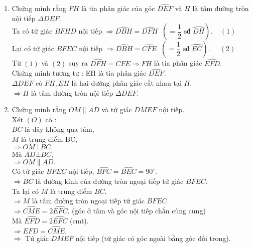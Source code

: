 \begin{ex}
{\begin{enumerate}
					Xét tứ giác $BFEC$ có :
					$\widehat{BFC} = \widehat{BEC}=90 ^{\circ}$\\
					$\Rightarrow$ tứ giác $BFEC$ nội tiếp (tứ giác có $2$ đỉnh liên tiếp cùng nhìn một cạnh dưới hai góc bằng nhau).
			\item Chứng minh rằng $FH$ là tia phân giác của góc $\widehat{DEF}$ và $H$ là tâm đường tròn nội tiếp $\Delta DEF.$\\
					Ta có tứ giác $BFHD$ nội tiếp $\Rightarrow \widehat{DBH} = \widehat{DFH} \;\;(=\dfrac{1}{2}\text{ sđ } \wideparen {DH}).\;\;\;\;(1)$\\
					Lại có tứ giác $BFEC$ nội tiếp $\Rightarrow \widehat{DBH} = \widehat{CFE} \;\;(=\dfrac{1}{2}\text{ sđ } \wideparen {EC}).\;\;\;\;\;(2)$\\
					Từ $(1)$ và $(2)$ suy ra $\widehat{DFH}=\widehat{CFE} \Rightarrow FH$ là tia phân giác $\widehat{EFD}.$\\
					Chứng minh tương tự : EH là tia phân giác $\widehat{DEF}.$\\
					$\Delta DEF$ có $FH,EH$ là hai đường phân giác cắt nhau tại $H$.\\
					$\Rightarrow H$ là tâm đường tròn nội tiếp $\Delta DEF.$
			\item Chứng minh rằng $OM \parallel AD$ và tứ giác $DMEF$ nội tiếp.\\
					Xét $(O)$ có :\\
						$BC$ là dây không qua tâm,\\
						$M$ là trung điểm BC,\\
					$\Rightarrow OM\bot BC.$\\
					Mà $AD\bot BC,$\\
					$\Rightarrow OM \parallel AD.$\\
					Có tứ giác $BFEC$ nội tiếp, $\widehat{BFC} = \widehat{BEC}=90^{\circ}.$\\
					$\Rightarrow BC$ là đường kính của đường tròn ngoại tiếp tứ giác $BFEC.$\\
					Ta lại có $M$ là trung điểm $BC.$\\
					$\Rightarrow M$ là tâm đường tròn ngoại tiếp tứ giác $BFEC$.\\
					$\Rightarrow \widehat{CME} = 2\widehat{EFC}.$ (góc ở tâm và góc nội tiếp chắn cùng cung)\\
					Mà $\widehat{EFD} = 2\widehat{EFC}$ (cmt).\\
					$\Rightarrow \widehat{EFD} = \widehat{CME}.$\\
					$\Rightarrow$ Tứ giác $DMEF$ nội tiếp (tứ giác có góc ngoài bằng góc đối trong).

\end{enumerate}}
\end{ex}
